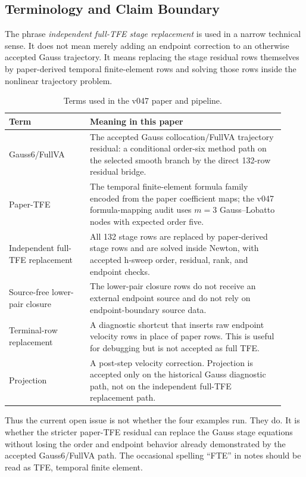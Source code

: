 \documentclass[11pt]{article}
\newcommand{\method}{Gauss6/FullVA}
\newcommand{\tfe}{TFE}
\begin{document}
\subsection{Terminology and Claim Boundary}

The phrase \emph{independent full-\tfe{} stage replacement} is used in a narrow
technical sense.  It does not mean merely adding an endpoint correction to an
otherwise accepted Gauss trajectory.  It means replacing the stage residual
rows themselves by paper-derived temporal finite-element rows and solving those
rows inside the nonlinear trajectory problem.

\begin{table}[t]
\centering
\caption{Terms used in the v047 paper and pipeline.}
\label{tab:terms}
\begin{tabular}{p{0.27\linewidth}p{0.65\linewidth}}
\toprule
Term & Meaning in this paper \\
\midrule
\method{} &
The accepted Gauss collocation/FullVA trajectory residual: a conditional
order-six method path on the selected smooth branch by the direct 132-row
residual bridge. \\
Paper-\tfe{} &
The temporal finite-element formula family encoded from the paper coefficient
maps; the v047 formula-mapping audit uses $m=3$ Gauss--Lobatto nodes with
expected order five. \\
Independent full-\tfe{} replacement &
All 132 stage rows are replaced by paper-derived stage rows and are solved
inside Newton, with accepted h-sweep order, residual, rank, and endpoint checks. \\
Source-free lower-pair closure &
The lower-pair closure rows do not receive an external endpoint source and do
not rely on endpoint-boundary source data. \\
Terminal-row replacement &
A diagnostic shortcut that inserts raw endpoint velocity rows in place of
paper rows.  This is useful for debugging but is not accepted as full \tfe{}. \\
Projection &
A post-step velocity correction.  Projection is accepted only on the historical
Gauss diagnostic path, not on the independent full-\tfe{} replacement path. \\
\bottomrule
\end{tabular}
\end{table}

Thus the current open issue is not whether the four examples run.  They do.
It is whether the stricter paper-\tfe{} residual can replace the Gauss stage
equations without losing the order and endpoint behavior already demonstrated
by the accepted \method{} path.  The occasional spelling ``FTE'' in notes should
be read as \tfe{}, temporal finite element.
\end{document}
